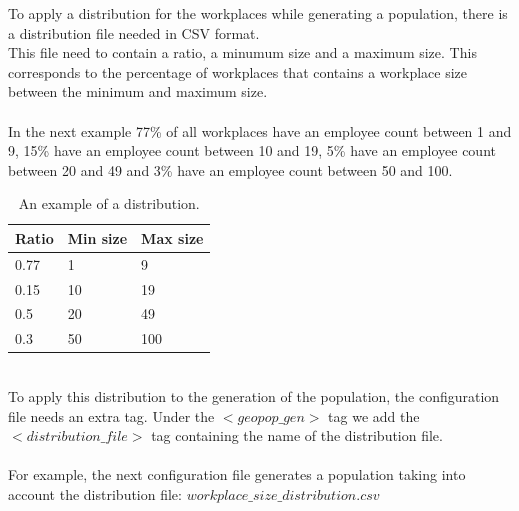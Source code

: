 To apply a distribution for the workplaces while generating a population, there is a distribution file needed in CSV format.\\
This file need to contain a ratio, a minumum size and a maximum size. This corresponds to the percentage of workplaces that contains a workplace size between the minimum and maximum size.\\
\\
In the next example 77\% of all workplaces have an employee count between 1 and 9, 15\% have an employee count between 10 and 19, 5\% have an employee count between 20 and 49 and 3\% have an employee count between 50 and 100.\\ 
\begin{table}
    \begin{center}
    \begin{tabular}{ | l | l | l |}
    \hline
    \textbf{Ratio} & \textbf{Min size} & \textbf{Max size} \\ \hline
    0.77 & 1 & 9 \\ \hline
    0.15 & 10 & 19 \\ \hline
    0.5 & 20 & 49 \\ \hline
    0.3 & 50 & 100 \\
    \hline
    \end{tabular}
    \end{center}
    \caption{\label{tab:table-name}An example of a distribution.}
\end{table}
\\
To apply this distribution to the generation of the population, the configuration file needs an extra tag. Under the $<geopop\_gen>$ tag we add the $<distribution\_file>$ tag containing the name of the distribution file.\\
\\
For example, the next configuration file generates a population taking into account the distribution file: $workplace\_size\_distribution.csv$\\

